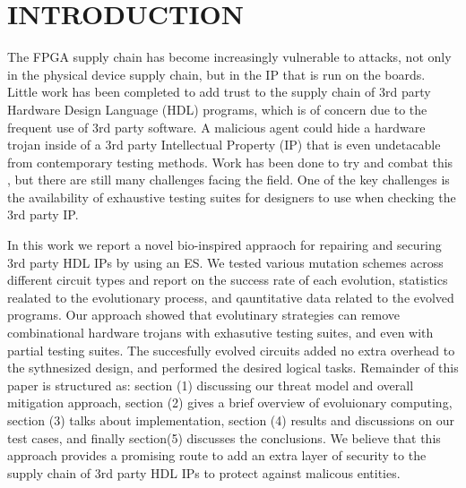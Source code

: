 \documentclass[conference]{IEEEtran}
\begin{document}



\section{INTRODUCTION}
\par The FPGA supply chain has become increasingly vulnerable to attacks, not only in the physical device supply chain, but in the IP that is run on the boards.
Little work has been completed to add trust to the supply chain of 3rd party Hardware Design Language (HDL) programs, which is of concern due to the frequent use of 3rd party software.
A malicious agent could hide a hardware trojan inside of a 3rd party Intellectual Property (IP) that is even undetacable from contemporary testing methods\cite{}.
Work has been done to try and combat this \cite{}, but there are still many challenges facing the field.
One of the key challenges is the availability of exhaustive testing suites for designers to use when checking the 3rd party IP.

\par In this work we report a novel bio-inspired appraoch for repairing and securing 3rd party HDL IPs by using an ES. 
We tested various mutation schemes across different circuit types and report on the success rate of each evolution, statistics realated to the evolutionary process, and qauntitative data related to the evolved programs.
Our approach showed that evolutinary strategies can remove combinational hardware trojans with exhasutive testing suites, and even with partial testing suites. 
The succesfully evolved circuits added no extra overhead to the sythnesized design, and performed the desired logical tasks.
Remainder of this paper is structured as: section (1) discussing our threat model and overall mitigation approach, section (2) gives a brief overview of evoluionary computing, section (3) talks about implementation, section (4) results and discussions on our test cases, and finally section(5) discusses the conclusions. 
We believe that this approach provides a promising route to add an extra layer of security to the supply chain of 3rd party HDL IPs to protect against malicous entities.

\end{document}
